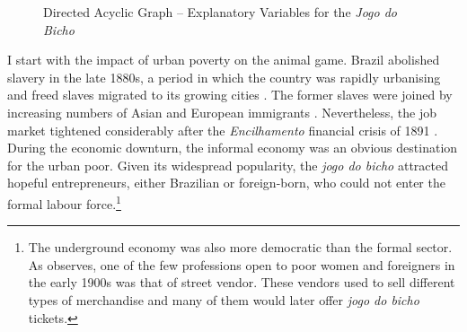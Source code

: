 \begin{figure}[!htbp]
 \caption{Directed Acyclic Graph -- Explanatory Variables for the \emph{Jogo do Bicho}}
 \label{fig:dag}
\end{figure}

I start with the impact of urban poverty on the animal game. Brazil abolished slavery in the late 1880s, a period in which the country was rapidly urbanising and freed slaves migrated to its growing cities \citep{andrews1991blacks, fausto2014concise, naro1992revision, skidmore1993black}. The former slaves were joined by increasing numbers of Asian and European immigrants \citep{hall1969origins, lesser2013immigration, smith1979ethnic}. Nevertheless, the job market tightened considerably after the \emph{Encilhamento} financial crisis of 1891 \citep{topik2014political, triner2005baring}. During the economic downturn, the informal economy was an obvious destination for the urban poor. Given its widespread popularity, the \emph{jogo do bicho} attracted hopeful entrepreneurs, either Brazilian or foreign-born, who could not enter the formal labour force.\footnote{The underground economy was also more democratic than the formal sector. As \citet[115]{chazkel2011laws} observes, one of the few professions open to poor women and foreigners in the early 1900s was that of street vendor. These vendors used to sell different types of merchandise and many of them would later offer \emph{jogo do bicho} tickets.}

